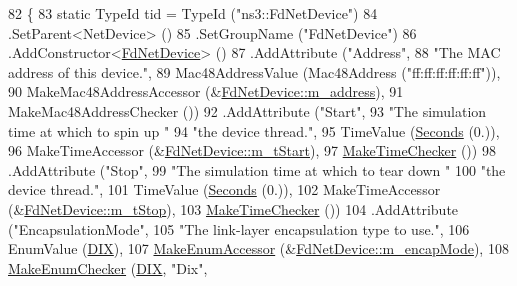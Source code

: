 \begin{DoxyCode}
82 \{
83   \textcolor{keyword}{static} TypeId tid = TypeId (\textcolor{stringliteral}{"ns3::FdNetDevice"})
84     .SetParent<NetDevice> ()
85     .SetGroupName (\textcolor{stringliteral}{"FdNetDevice"})
86     .AddConstructor<\hyperlink{classns3_1_1FdNetDevice_a81fa1519bf5abcb59cf902d74e264b53}{FdNetDevice}> ()
87     .AddAttribute (\textcolor{stringliteral}{"Address"},
88                    \textcolor{stringliteral}{"The MAC address of this device."},
89                    Mac48AddressValue (Mac48Address (\textcolor{stringliteral}{"ff:ff:ff:ff:ff:ff"})),
90                    MakeMac48AddressAccessor (&\hyperlink{classns3_1_1FdNetDevice_ad6ce5cc7c15f7a9c79a0c822aea60036}{FdNetDevice::m\_address}),
91                    MakeMac48AddressChecker ())
92     .AddAttribute (\textcolor{stringliteral}{"Start"},
93                    \textcolor{stringliteral}{"The simulation time at which to spin up "}
94                    \textcolor{stringliteral}{"the device thread."},
95                    TimeValue (\hyperlink{group__timecivil_ga33c34b816f8ff6628e33d5c8e9713b9e}{Seconds} (0.)),
96                    MakeTimeAccessor (&\hyperlink{classns3_1_1FdNetDevice_a6349cf5842c54a0420f9e41422895efa}{FdNetDevice::m\_tStart}),
97                    \hyperlink{group__time_ga7032965bd4afa578691d88c09e4481c1}{MakeTimeChecker} ())
98     .AddAttribute (\textcolor{stringliteral}{"Stop"},
99                    \textcolor{stringliteral}{"The simulation time at which to tear down "}
100                    \textcolor{stringliteral}{"the device thread."},
101                    TimeValue (\hyperlink{group__timecivil_ga33c34b816f8ff6628e33d5c8e9713b9e}{Seconds} (0.)),
102                    MakeTimeAccessor (&\hyperlink{classns3_1_1FdNetDevice_ac97346af9ad4364aa3d1d7db0516fca5}{FdNetDevice::m\_tStop}),
103                    \hyperlink{group__time_ga7032965bd4afa578691d88c09e4481c1}{MakeTimeChecker} ())
104     .AddAttribute (\textcolor{stringliteral}{"EncapsulationMode"},
105                    \textcolor{stringliteral}{"The link-layer encapsulation type to use."},
106                    EnumValue (\hyperlink{classns3_1_1FdNetDevice_abdacbf10c181f50998a98e7688016618a47e79129b21891ac4452ab35e05bd17d}{DIX}),
107                    \hyperlink{namespacens3_af5050739867ce63896dec011e332c8ec}{MakeEnumAccessor} (&\hyperlink{classns3_1_1FdNetDevice_aa5d97abfd57576f6b80423ac764e5cc8}{FdNetDevice::m\_encapMode}),
108                    \hyperlink{namespacens3_a48832781a2b521d3d0091e05ece30615}{MakeEnumChecker} (\hyperlink{classns3_1_1FdNetDevice_abdacbf10c181f50998a98e7688016618a47e79129b21891ac4452ab35e05bd17d}{DIX}, \textcolor{stringliteral}{"Dix"},

\end{DoxyCode}
